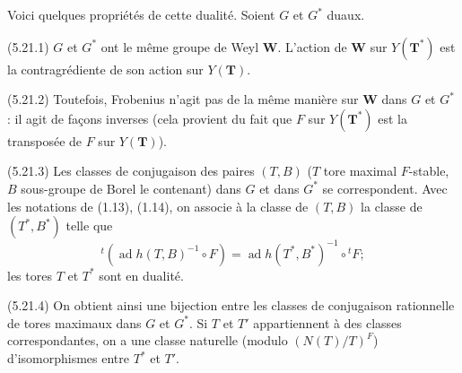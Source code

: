 \documentclass[9pt,twoside]{extarticle}
\begin{document}
{Voici quelques propriétés de cette dualité. Soient \(G\) et \(G^*\) duaux.\par

(5.21.1) \(G\) et \(G^*\) ont le même groupe de Weyl \(\mathbf W\). L'action de \(\mathbf W\) sur \(Y(\mathbf T^*)\) est la contragrédiente de son action sur \(Y(\mathbf T)\).\par

(5.21.2) Toutefois, Frobenius n'agit pas de la même manière sur \(\mathbf W\) dans \(G\) et \(G^*\) : il agit de façons inverses (cela provient du fait que \(F\) sur \(Y(\mathbf T^*)\) est la transposée de \(F\) sur \(Y(\mathbf T)\)).\par

(5.21.3) Les classes de conjugaison des paires \((T,B)\) (\(T\) tore maximal \(F\)-stable, \(B\) sous-groupe de Borel le contenant) dans \(G\) et dans \(G^*\) se correspondent. Avec les notations de (1.13), (1.14), on associe à la classe de \((T,B)\) la classe de \((T^*,B^*)\) telle que \[
{}^t(\operatorname{ad}h(T,B)^{-1}\circ F)
=
\operatorname{ad}h(T^*,B^*)^{-1}\circ{}^tF ;
\] les tores \(T\) et \(T^*\) sont en dualité.\par

(5.21.4) On obtient ainsi une bijection entre les classes de conjugaison rationnelle de tores maximaux dans \(G\) et \(G^*\). Si \(T\) et \(T'\) appartiennent à des classes correspondantes, on a une classe naturelle (modulo \((N(T)/T)^F\)) d'isomorphismes entre \(T^*\) et \(T'\).\par
}
\end{document}
